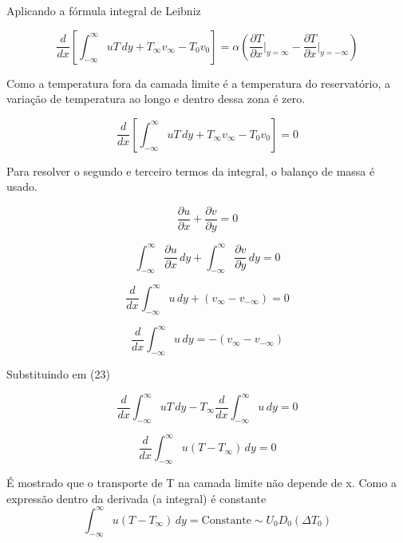 \documentclass[12pt]{article}
\begin{document}
Aplicando a fórmula integral de Leibniz

\begin{equation}
	\frac{d}{dx} \left[ \int_{-\infty}^{\infty} u T \, dy + T_\infty v_\infty - T_0 v_0 \right] = \alpha \left( \frac{\partial T}{\partial x} \bigg|_{y=\infty} - \frac{\partial T}{\partial x} \bigg|_{y=-\infty} \right)
\end{equation}

Como a temperatura fora da camada limite é a temperatura do reservatório, a variação de temperatura ao longo e dentro dessa zona é zero.

\begin{equation}
	\frac{d}{dx} \left[ \int_{-\infty}^{\infty} u T \, dy + T_\infty v_\infty - T_0 v_0 \right] = 0
\end{equation}

Para resolver o segundo e terceiro termos da integral, o balanço de massa é usado.

\begin{equation}
	\frac{\partial u}{\partial x} + \frac{\partial v}{\partial y} = 0
\end{equation}

\begin{equation}
	\int_{-\infty}^{\infty} \frac{\partial u}{\partial x} \, dy + \int_{-\infty}^{\infty} \frac{\partial v}{\partial y} \, dy = 0
\end{equation}

\begin{equation}
	\frac{d}{dx} \int_{-\infty}^{\infty} u \, dy + (v_\infty - v_{-\infty}) = 0
\end{equation}

\begin{equation}
	\frac{d}{dx} \int_{-\infty}^{\infty} u \, dy = -(v_\infty - v_{-\infty}) 
\end{equation}

Substituindo em (23)

\begin{equation}
	\frac{d}{dx} \int_{-\infty}^{\infty} u T \, dy - T_\infty \frac{d}{dx} \int_{-\infty}^{\infty} u \, dy = 0
\end{equation}

\begin{equation}
	\frac{d}{dx} \int_{-\infty}^{\infty} u (T - T_\infty) \, dy = 0
\end{equation}

É mostrado que o transporte de T na camada limite não depende de x. Como a expressão dentro da derivada (a integral) é constante
\begin{equation}
	\int_{-\infty}^{\infty} u (T - T_\infty) \, dy = \text{Constante} \sim  U_0 D_0 (\Delta T_{0})
\end{equation}
\end{document}
